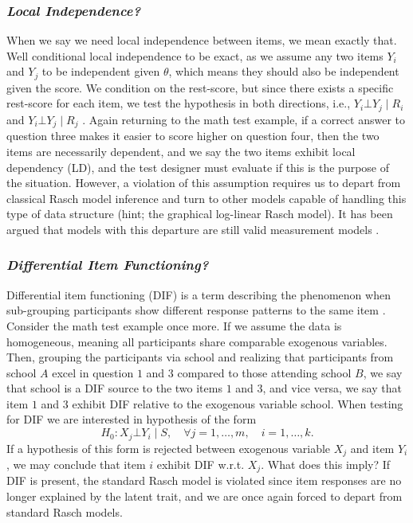 \documentclass[a4project,12pt]{article}
\theoremstyle{examplestyle}
\theoremstyle{defstyle}
\theoremstyle{thmstyle}
\begin{document}
\subsubsection{\textit{Local Independence?}}

When we say we need local independence between items, we mean exactly that. Well conditional local independence to be exact, as we assume any two items $Y_i$ and $Y_j$ to be independent given $\theta$, which means they should also be independent given the score. We condition on the rest-score, but since there exists a specific rest-score for each item, we test the hypothesis in both directions, i.e., $Y_i \bot Y_j \mid R_i$ and $Y_i \bot Y_j \mid R_j$ \cite{Kreiner2013c_local_dependece_test}. Again returning to the math test example, if a correct answer to question three makes it easier to score higher on question four, then the two items are necessarily dependent, and we say the two items exhibit local dependency (LD), and the test designer must evaluate if this is the purpose of the situation. However, a violation of this assumption requires us to depart from classical Rasch model inference and turn to other models capable of handling this type of data structure (hint; the graphical log-linear Rasch model). It has been argued that models with this departure are still valid measurement models \cite{Kreiner2007_reflections}.


\subsubsection{\textit{Differential Item Functioning?}}
Differential item functioning (DIF) is a term describing the phenomenon when sub-grouping participants show different response patterns to the same item \cite{holland-wainer_DIF}. Consider the math test example once more. If we assume the data is homogeneous, meaning all participants share comparable exogenous variables. Then, grouping the participants via school and realizing that participants from school $A$ excel in question $1$ and $3$ compared to those attending school $B$, we say that school is a DIF source to the two items $1$ and $3$, and vice versa, we say that item $1$ and $3$ exhibit DIF relative to the exogenous variable school. When testing for DIF we are interested in hypothesis of the form 
\begin{equation}
    H_0: X_j \bot Y_i \mid S, \quad \forall j=1,\dots,m,\quad i=1,\dots,k.
\end{equation}
If a hypothesis of this form is rejected between exogenous variable $X_j$ and item $Y_i$, we may conclude that item $i$ exhibit DIF w.r.t. $X_j$. What does this imply? If DIF is present, the standard Rasch model is violated since item responses are no longer explained by the latent trait, and we are once again forced to depart from standard Rasch models. 
\end{document}
